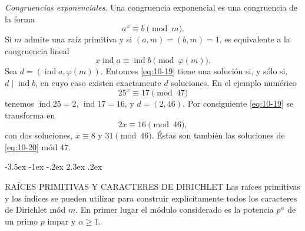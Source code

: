 \documentclass[12pt,a4paper]{book}
\makeatletter
\renewcommand\section{\@startsection{section}{1}{\z@}%
  {-3.5ex \@plus -1ex \@minus -.2ex}%
  {2.3ex \@plus .2ex}%
  {\normalfont\Large\bfseries\raggedright}}
\makeatother
\begin{document}
    \begin{ejemplo}
        \textit{Congruencias exponenciales.} Una congruencia exponencial es una congruencia
        de la forma
        \begin{equation*}
            a^{x}\equiv b\pmod{m}.
        \end{equation*}
        Si $m$ admite una raíz primitiva y si $(a,m)=(b,m)=1$, es equivalente a la
        congruencia lineal
        \begin{equation}\label{eq:10-19}
            x\operatorname{ind}a\equiv\operatorname{ind}b\pmod{\varphi(m)}.
        \end{equation}
        Sea $d=(\operatorname{ind}a,\varphi(m))$. Entonces \eqref{eq:10-19} tiene una
        solución si, y sólo si, $d\mid\operatorname{ind}b$, en cuyo caso existen exactamente
        $d$ soluciones. En el ejemplo numérico
        \begin{equation}\label{eq:10-20}
            25^{x}\equiv17\pmod{47}
        \end{equation}
        tenemos $\operatorname{ind}25=2$, $\operatorname{ind}17=16$, y $d=(2,46)$. Por
        consiguiente \eqref{eq:10-19} se transforma en
        \begin{equation*}
            2x\equiv16\pmod{46},
        \end{equation*}
        con dos soluciones, $x\equiv8$ y $31\pmod{46}$. Éstas son también las soluciones de
        \eqref{eq:10-20} mód 47.
    \end{ejemplo}

    \section{RAÍCES PRIMITIVAS Y CARACTERES DE DIRICHLET}
    Las raíces primitivas y los índices se pueden utilizar para construir explícitamente
    todos los caracteres de Dirichlet mód $m$. En primer lugar el módulo considerado es la
    potencia $p^{\alpha}$ de un primo $p$ impar y $\alpha\geq1$.
\end{document}
